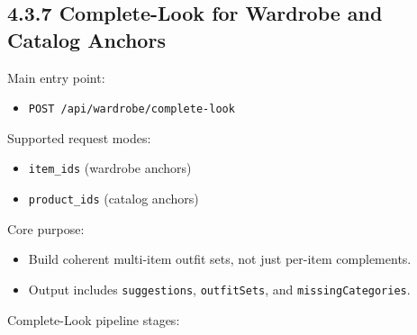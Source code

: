 \documentclass[12pt,a4paper]{report}
\begin{document}
\subsection{4.3.7 Complete-Look for Wardrobe and Catalog Anchors}
Main entry point:

\begin{itemize}
\item \texttt{POST /api/wardrobe/complete-look}
\end{itemize}

Supported request modes:

\begin{itemize}
\item \texttt{item\_ids} (wardrobe anchors)
\item \texttt{product\_ids} (catalog anchors)
\end{itemize}

Core purpose:

\begin{itemize}
\item Build coherent multi-item outfit sets, not just per-item complements.
\item Output includes \texttt{suggestions}, \texttt{outfitSets}, and \texttt{missingCategories}.
\end{itemize}

Complete-Look pipeline stages:
\end{document}
